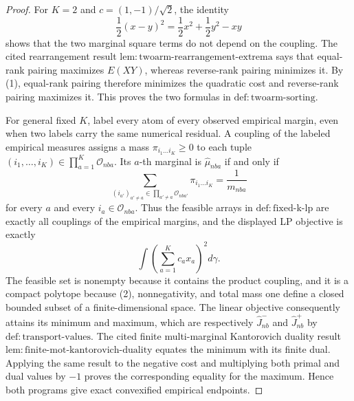 \documentclass{article}
\begin{document}
\begin{proof}
For \(K=2\) and \(c=(1,-1)/\sqrt2\), the identity
\[
\frac12(x-y)^2=\frac12x^2+\frac12y^2-xy
\tag{1}
\]
shows that the two marginal square terms do not depend on the coupling. The cited rearrangement result \(\mathrm{lem:twoarm\text{-}rearrangement\text{-}extrema}\) says that equal-rank pairing maximizes \(E(XY)\), whereas reverse-rank pairing minimizes it. By (1), equal-rank pairing therefore minimizes the quadratic cost and reverse-rank pairing maximizes it. This proves the two formulas in \(\mathrm{def:twoarm\text{-}sorting}\).

For general fixed \(K\), label every atom of every observed empirical margin, even when two labels carry the same numerical residual. A coupling of the labeled empirical measures assigns a mass \(\pi_{i_1\ldots i_K}\ge0\) to each tuple
\((i_1,\ldots,i_K)\in\prod_{a=1}^K\mathcal O_{nba}\). Its \(a\)-th marginal is \(\widehat\mu_{nba}\) if and only if
\[
\sum_{(i_{a'})_{a'\ne a}\in\prod_{a'\ne a}\mathcal O_{nba'}}
\pi_{i_1\ldots i_K}=\frac1{m_{nba}}
\tag{2}
\]
for every \(a\) and every \(i_a\in\mathcal O_{nba}\). Thus the feasible arrays in \(\mathrm{def:fixed\text{-}k\text{-}lp}\) are exactly all couplings of the empirical margins, and the displayed LP objective is exactly
\[
\int\left(\sum_{a=1}^Kc_ax_a\right)^2d\gamma.
\]
The feasible set is nonempty because it contains the product coupling, and it is a compact polytope because (2), nonnegativity, and total mass one define a closed bounded subset of a finite-dimensional space. The linear objective consequently attains its minimum and maximum, which are respectively \(\widehat J_{nb}^{-}\) and \(\widehat J_{nb}^{+}\) by \(\mathrm{def:transport\text{-}values}\). The cited finite multi-marginal Kantorovich duality result \(\mathrm{lem:finite\text{-}mot\text{-}kantorovich\text{-}duality}\) equates the minimum with its finite dual. Applying the same result to the negative cost and multiplying both primal and dual values by \(-1\) proves the corresponding equality for the maximum. Hence both programs give exact convexified empirical endpoints.


\end{proof}
\end{document}

